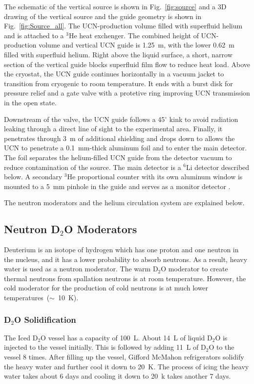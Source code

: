 The schematic of the vertical source is shown in Fig.~\ref{fig:source}
and a 3D drawing of the vertical source and the guide geometry is
shown in Fig.~\ref{fig:Source_all}. The UCN-production volume filled
with superfluid helium and is attached to a $^3$He heat exchenger. The
combined height of UCN-production volume and vertical UCN guide is
1.25~m, with the lower 0.62~m filled with superfluid helium. Right
above the liquid surface, a short, narrow section of the vertical
guide blocks superfluid film flow to reduce heat load. Above the
cryostat, the UCN guide continues horizontally in a vacuum jacket to
transition from cryogenic to room temperature. It ends with a burst
disk for pressure relief and a gate valve with a protetive ring
improving UCN transmission in the open state.

Downstream of the valve, the UCN guide follows a 45$^\circ$ kink to
avoid radiation leaking through a direct line of sight to the
experimental area. Finally, it penetrates through 3~m of additional
shielding and drops down to allows the UCN to penetrate a 0.1~mm-thick
aluminum foil and to enter the main detector. The foil separates the
helium-filled UCN guide from the detector vacuum to reduce
contamination of the source. The main detector is a $^6$Li detector
described below. A secondary $^3$He proportional counter with its own
aluminum window is mounted to a 5~mm pinhole in the guide and serves
as a monitor detector .




The neutron moderators and the helium circulation system are explained
below.


\subsection{Neutron D$_2$O Moderators}
Deuterium is an isotope of hydrogen which has one proton and one
neutron in the nucleus, and it has a lower probability to absorb
neutrons. As a result, heavy water is used as a neutron moderator. The
warm D$_2$O moderator to create thermal neutrons from spallation
neutrons is at room temperature. However, the cold moderator for the
production of cold neutrons is at much lower
temperatures~($\sim$~10~K).

\subsubsection{D$_2$O Solidification}
The Iced D$_2$O vessel has a capacity of 100~L. About 14~L of liquid
D$_2$O is injected to the vessel initially. This is followed by adding 11~L of
D$_2$O to the vessel 8 times.  After filling up the vessel,
Gifford McMahon refrigerators solidify the heavy water and further
cool it down to 20~K. The process of icing the heavy water takes about
6 days and cooling it down to 20~k takes another 7 days.



